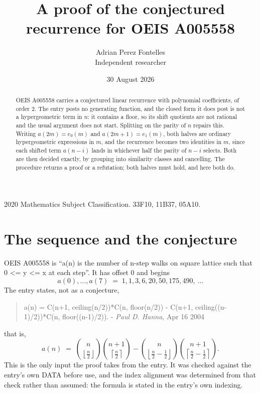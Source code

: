 \documentclass[11pt,a4paper]{article}
\title{A proof of the conjectured recurrence for OEIS A005558}
\author{Adrian Perez Fontelles\\ \small Independent researcher}
\date{30 August 2026}
\theoremstyle{plain}
\theoremstyle{definition}
\begin{document}
\maketitle

\begin{abstract}
OEIS A005558 carries a conjectured linear recurrence with polynomial coefficients, of
order 2. The entry posts no generating function, and the closed form it does post
is not a hypergeometric term in $n$: it contains a floor, so its shift quotients are not
rational and the usual argument does not start. Splitting on the parity of $n$ repairs
this. Writing $a(2m)=e_{0}(m)$ and $a(2m+1)=e_{1}(m)$, both halves are ordinary
hypergeometric expressions in $m$, and the recurrence becomes two identities in $m$, since
each shifted term $a(n-i)$ lands in whichever half the parity of $n-i$ selects. Both are
then decided exactly, by grouping into similarity classes and cancelling. The procedure
returns a proof or a refutation; both halves must hold, and here both do.
\end{abstract}

\noindent\small 2020 Mathematics Subject Classification. 33F10, 11B37, 05A10.\normalsize

\section{The sequence and the conjecture}

OEIS A005558 is ``a(n) is the number of n-step walks on square lattice such that 0 <= y <= x at each step''. It has offset $0$ and begins
\[
a(0),\dots,a(7)\;=\;1, 1, 3, 6, 20, 50, 175, 490,\ \dots
\]
The entry states, not as a conjecture,
\begin{quote}\small
a(n) = C(n+1, ceiling(n/2))*C(n, floor(n/2)) - C(n+1, ceiling((n-1)/2))*C(n, floor((n-1)/2)). - \emph{Paul D. Hanna}, Apr 16 2004
\end{quote}
that is,
\begin{equation}\label{eq:cf}
a(n)\;=\;{\binom{n}{\left\lfloor{\frac{n}{2}}\right\rfloor}} {\binom{n + 1}{\left\lceil{\frac{n}{2}}\right\rceil}} - {\binom{n}{\left\lfloor{\frac{n}{2} - \frac{1}{2}}\right\rfloor}} {\binom{n + 1}{\left\lceil{\frac{n}{2} - \frac{1}{2}}\right\rceil}} .
\end{equation}
This is the only input the proof takes from the entry. It was checked against the entry's
own DATA before use, and the index alignment was determined from that check rather than
assumed: the formula is stated in the entry's own indexing.
\end{document}
